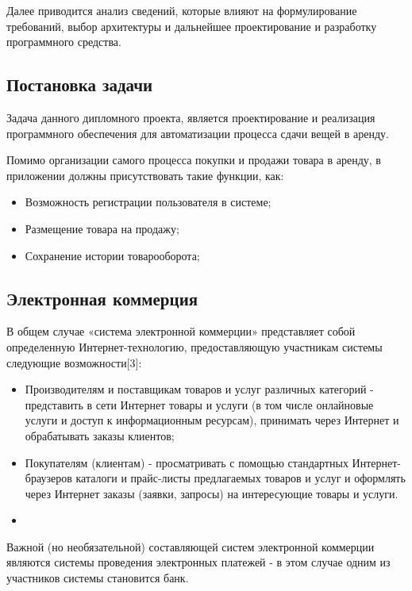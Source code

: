 Далее приводится анализ сведений, которые влияют на формулирование требований, выбор архитектуры и дальнейшее проектирование и разработку программного средства.

\subsection{Постановка задачи}

Задача данного дипломного проекта, является проектирование  и реализация программного обеспечения для автоматизации процесса сдачи вещей в аренду.

Помимо организации самого процесса покупки и продажи товара в аренду, в приложении должны присутствовать такие функции, как:
\begin{itemize}
  \item Возможность регистрации пользователя в системе;
  \item Размещение товара на продажу;
  \item Сохранение истории  товарооборота;
  \end{itemize}


\subsection{Электронная коммерция}
В общем случае «система электронной коммерции» представляет собой определенную Интернет-технологию, предоставляющую участникам системы следующие возможности[3]:
\begin{itemize}
  \item Производителям и поставщикам товаров и услуг различных категорий - представить в сети Интернет товары и услуги (в том числе онлайновые услуги и доступ к информационным ресурсам), принимать через Интернет и обрабатывать заказы клиентов;
  \item Покупателям (клиентам) - просматривать с помощью стандартных Интернет-браузеров каталоги и прайс-листы предлагаемых товаров и услуг и оформлять через Интернет заказы (заявки, запросы) на интересующие товары и услуги.
  \item
\end{itemize}

Важной (но необязательной) составляющей систем электронной коммерции являются системы проведения электронных платежей - в этом случае одним из участников системы становится банк.

